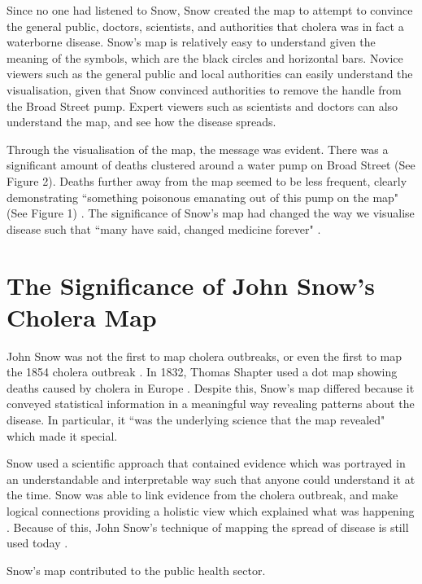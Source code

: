 \documentclass[12pt]{article}
\begin{document}
Since no one had listened to Snow, Snow created the map to attempt to convince the general public, doctors, scientists, and authorities that cholera was in fact a waterborne disease. Snow's map is relatively easy to understand given the meaning of the symbols, which are the black circles and horizontal bars. Novice viewers such as the general public and local authorities can easily understand the visualisation, given that Snow convinced authorities to remove the handle from the Broad Street pump. Expert viewers such as scientists and doctors can also understand the map, and see how the disease spreads. 

Through the visualisation of the map, the message was evident. There was a significant amount of deaths clustered around a water pump on Broad Street (See Figure 2). Deaths further away from the map seemed to be less frequent, clearly demonstrating ``something poisonous emanating out of this pump on the map" (See Figure 1) \cite{blog}. The significance of Snow's map had changed the way we visualise disease such that ``many have said, changed medicine forever" \cite{heros}.

\section{The Significance of John Snow's Cholera Map}

John Snow was not the first to map cholera outbreaks, or even the first to map the 1854 cholera outbreak \cite{history, johnson}. In 1832, Thomas Shapter used a dot map showing deaths caused by cholera in Europe \cite{howe1970some}. Despite this, Snow's map differed because it conveyed statistical information in a meaningful way revealing patterns about the disease. In particular, it ``was the underlying science that the map revealed" \cite{johnson, history} which made it special.

Snow used a scientific approach that contained evidence which was portrayed in an understandable and interpretable way such that anyone could understand it at the time. Snow was able to link evidence from the cholera outbreak, and make logical connections providing a holistic view which explained what was happening \cite{channel1}. Because of this, John Snow's technique of mapping the spread of disease is still used today \cite{channel1}. 

Snow's map contributed to the public health sector.
\end{document}

